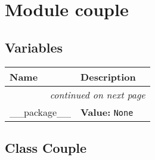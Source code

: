 %
%
%


\section{Module couple}

    \label{couple}


  \subsection{Variables}

    \vspace{-1cm}
\hspace{\varindent}\begin{longtable}{|p{\varnamewidth}|p{\vardescrwidth}|l}
\cline{1-2}
\cline{1-2} \centering \textbf{Name} & \centering \textbf{Description}& \\
\cline{1-2}
\endhead\cline{1-2}\multicolumn{3}{r}{\small\textit{continued on next page}}\\\endfoot\cline{1-2}
\endlastfoot\raggedright \_\-\_\-p\-a\-c\-k\-a\-g\-e\-\_\-\_\- & \raggedright \textbf{Value:} 
{\tt None}&\\
\cline{1-2}
\end{longtable}



\subsection{Class Couple}

    \label{couple:Couple}

